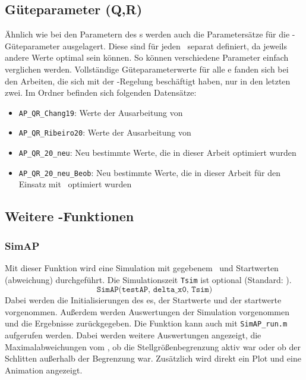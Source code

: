 \subsection{Güteparameter (Q,R)}\label{subsec:simqr}

Ähnlich wie bei den Parametern des \spd s werden auch die Parametersätze für die \ricc-Güteparameter ausgelagert.
Diese sind für jeden \ap\ separat definiert, da jeweils andere Werte optimal sein können.
So können verschiedene Parameter einfach verglichen werden.
Vollständige Güteparameterwerte für alle \ap e fanden sich bei den Arbeiten, die sich mit der \ap-Regelung beschäftigt haben, nur in den letzten zwei.
Im Ordner  befinden sich folgenden Datensätze:
\begin{itemize}
	\item \texttt{AP\_QR\_Chang19}: Werte der Ausarbeitung von \cite{chang}
	\item \texttt{AP\_QR\_Ribeiro20}: Werte der Ausarbeitung von \cite{ribeiro}
	\item \texttt{AP\_QR\_20\_neu}: Neu bestimmte Werte, die in dieser Arbeit optimiert wurden
	\item \texttt{AP\_QR\_20\_neu\_Beob}: Neu bestimmte Werte, die in dieser Arbeit für den Einsatz mit \beob\ optimiert wurden
\end{itemize}


\subsection{Weitere \Matlab-Funktionen}

\subsubsection{SimAP}
Mit dieser Funktion wird eine Simulation mit gegebenem \ap\ und Startwerten (\ap abweichung) durchgeführt. Die Simulationszeit \texttt{Tsim} ist optional (Standard: ).
\[
	\texttt{SimAP(testAP, delta\_x0, Tsim)}
\]
Dabei werden die Initialisierungen des \ap es, der Startwerte und der \beob startwerte vorgenommen.
Außerdem werden Auswertungen der Simulation vorgenommen  und die Ergebnisse zurückgegeben.
Die Funktion kann auch mit \texttt{SimAP\_run.m} aufgerufen werden. 
Dabei werden weitere Auswertungen angezeigt, \zB die Maximalabweichungen vom \ap, ob die Stellgrößenbegrenzung aktiv war oder ob der Schlitten außerhalb der Begrenzung war.
Zusätzlich wird direkt ein Plot und eine Animation  angezeigt.

